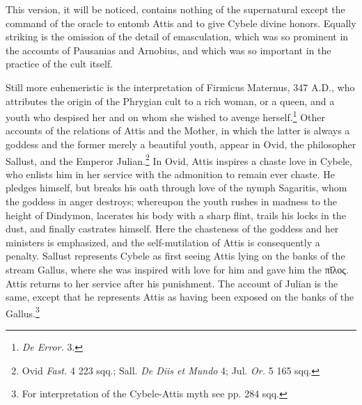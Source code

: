 \documentclass[a4paper, 11pt, oneside, polutonikogreek, english]{article}
\begin{document}
This version, it will be noticed, contains nothing of the supernatural except the command of the oracle to entomb Attis and to give Cybele divine honors. Equally striking is the omission of the detail of emasculation, which was so prominent in the accounts of Pausanias and Arnobius, and which was so important in the practice of the cult itself.

Still more euhemeristic is the interpretation of Firmicus Maternus, 347 \textsc{A.D.}, who attributes the origin of the Phrygian cult to a rich woman, or a queen, and a youth who despised her and on whom she wished to avenge herself.\footnote{\emph{De Error.} 3.} Other accounts of the relations of Attis and the Mother, in which the latter is always a goddess and the former merely a beautiful youth, appear in Ovid, the philosopher Sallust, and the Emperor Julian.\footnote{Ovid \emph{Fast.} 4 223 sqq.; Sall. \emph{De Diis et Mundo} 4; Jul. \emph{Or.} 5 165 sqq.} In Ovid, Attis inspires a chaste love in Cybele, who enlists him in her service with the admonition to remain ever chaste. He pledges himself, but breaks his oath through love of the nymph Sagaritis, whom the goddess in anger destroys; whereupon the youth rushes in madness to the height of Dindymon, lacerates his body with a sharp flint, trails his locks in the dust, and finally castrates himself. Here the chasteness of the goddess and her ministers is emphasized, and the self-mutilation of Attis is consequently a penalty. Sallust represents Cybele as first seeing Attis lying on the banks of the stream Gallus, where she was inspired with love for him and gave him the πῐλος. Attis returns to her service after his punishment. The account of Julian is the same, except that he represents Attis as having been exposed on the banks of the Gallus.\footnote{For interpretation of the Cybele-Attis myth see pp. 284 sqq.}
\end{document}
